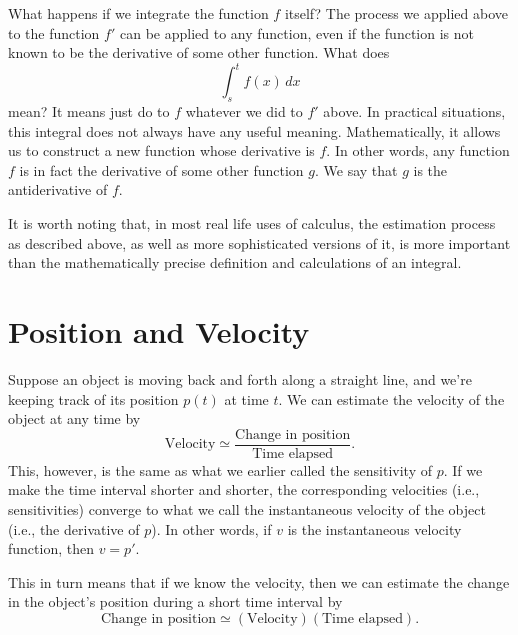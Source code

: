 \documentclass{math-deane}
\begin{document}
What happens if we integrate the function $f$ itself? The process we applied above to the function $f'$ can be applied to any function, even if the function is not known to be the derivative of some other function. What does
\[
\int_s^t f(x)\,dx
\]
mean? It means just do to $f$ whatever we did to $f'$ above. In practical situations, this integral does not always have any useful meaning. Mathematically, it allows us to construct a new function whose derivative is $f$. In other words, any function $f$ is in fact the derivative of some other function $g$. We say that $g$ is the antiderivative of $f$.

It is worth noting that, in most real life uses of calculus, the estimation process as described above, as well as more sophisticated versions of it, is more important than the mathematically precise definition and calculations of an integral.

\section{Position and Velocity}

Suppose an object is moving back and forth along a straight line, and we're keeping track of its position $p(t)$ at time $t$. We can estimate the velocity of the object at any time by
\begin{equation}\label{average-velocity}
  \text{Velocity} \simeq \frac{\text{Change in position}}{\text{Time elapsed}}.
\end{equation}
This, however, is the same as what we earlier called the sensitivity of $p$. If we make the time interval shorter and shorter, the corresponding velocities (i.e., sensitivities) converge to what we call the instantaneous velocity of the object (i.e., the derivative of $p$). In other words, if $v$ is the instantaneous velocity function, then $v = p'$.

This in turn means that if we know the velocity, then we can estimate the change in the object's position during a short time interval by
\begin{equation}\label{position-change}
  \text{Change in position} \simeq (\text{Velocity})(\text{Time elapsed}).
\end{equation}
\end{document}
